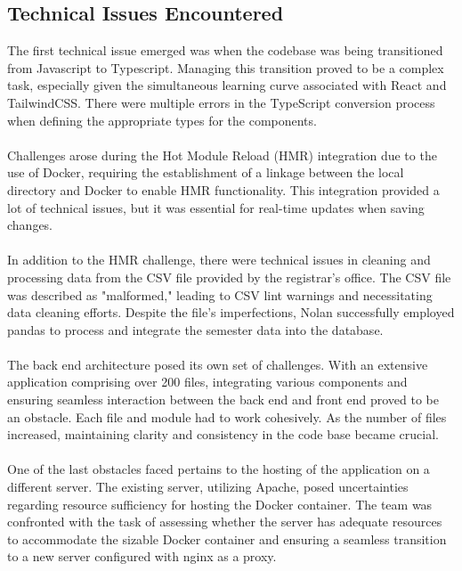 \documentclass[oneside,openany,obeyspaces]{book}
\newcommand\tab[1][1cm]{\hspace*{#1}}
\begin{document}
\begin{flushleft}
    \section{Technical Issues Encountered}
    \tab The first technical issue emerged was when the codebase was being transitioned from Javascript to Typescript. Managing this transition proved to be a complex task, especially given the simultaneous learning curve associated with React and TailwindCSS. There were multiple errors in the TypeScript conversion process when defining the appropriate types for the components.\\~\\
    \tab Challenges arose during the Hot Module Reload (HMR) integration due to the use of Docker, requiring the establishment of a linkage between the local directory and Docker to enable HMR functionality. This integration provided a lot of technical issues, but it was essential for real-time updates when saving changes. \\~\\
    \tab In addition to the HMR challenge, there were technical issues in cleaning and processing data from the CSV file provided by the registrar's office. The CSV file was described as "malformed," leading to CSV lint warnings and necessitating data cleaning efforts. Despite the file's imperfections, Nolan successfully employed pandas to process and integrate the semester data into the database.\\~\\
    \tab The back end architecture posed its own set of challenges. With an extensive application comprising over 200 files, integrating various components and ensuring seamless interaction between the back end and front end proved to be an obstacle. Each file and module had to work cohesively. As the number of files increased, maintaining clarity and consistency in the code base became crucial.\\~\\
    \tab One of the last obstacles faced pertains to the hosting of the application on a different server. The existing server, utilizing Apache, posed uncertainties regarding resource sufficiency for hosting the Docker container. The team was confronted with the task of assessing whether the server has adequate resources to accommodate the sizable Docker container and ensuring a seamless transition to a new server configured with nginx as a proxy.\\~\\



\end{flushleft}
\end{document}
